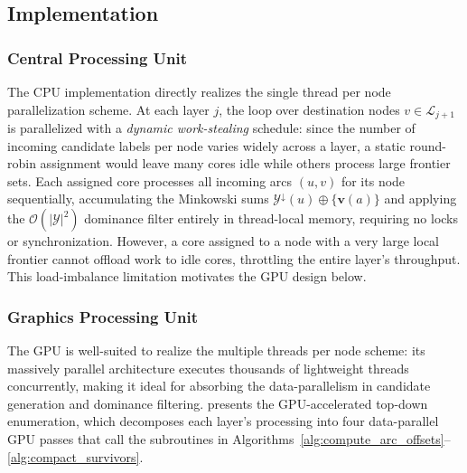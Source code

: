 \documentclass[letterpaper]{article}
\begin{document}
\subsection{Implementation}
\label{sec:parallel_impl}


\subsubsection{Central Processing Unit}


The CPU implementation directly realizes the single thread per node parallelization scheme. At each layer $j$, the loop over destination nodes $v \in \mathcal{L}_{j+1}$ is parallelized with a \emph{dynamic work-stealing} schedule: since the number of incoming candidate labels per node varies widely across a layer, a static round-robin assignment would leave many cores idle while others process large frontier sets. Each assigned core processes all incoming arcs $(u,v)$ for its node sequentially, accumulating the Minkowski sums $\mathcal{Y}^{\downarrow}(u) \oplus \{\mathbf{v}(a)\}$ and applying the $\mathcal{O}(|\mathcal{Y}|^2)$ dominance filter entirely in thread-local memory, requiring no locks or synchronization. However, a core assigned to a node with a very large local frontier cannot offload work to idle cores, throttling the entire layer's throughput. This load-imbalance limitation motivates the GPU design below.





\subsubsection{Graphics Processing Unit}
The GPU is well-suited to realize the multiple threads per node scheme: its massively parallel architecture executes thousands of lightweight threads concurrently, making it ideal for absorbing the data-parallelism in candidate generation and dominance filtering.  presents the GPU-accelerated top-down enumeration, which decomposes each layer's processing into four data-parallel GPU passes that call the subroutines in Algorithms~\ref{alg:compute_arc_offsets}--\ref{alg:compact_survivors}.
\end{document}
